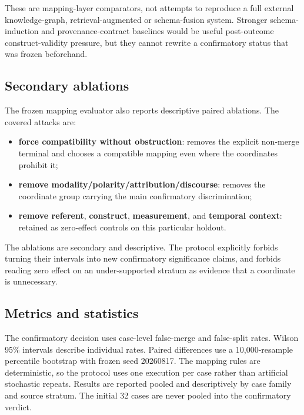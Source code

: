 These are mapping-layer comparators, not attempts to reproduce a full external
knowledge-graph, retrieval-augmented or schema-fusion system. Stronger
schema-induction and provenance-contract baselines would be useful
post-outcome construct-validity pressure, but they cannot rewrite a
confirmatory status that was frozen beforehand.

\subsection{Secondary ablations}

The frozen mapping evaluator also reports descriptive paired ablations. The
covered attacks are:

\begin{itemize}
    \item \textbf{force compatibility without obstruction}: removes the
          explicit non-merge terminal and chooses a compatible mapping even
          where the coordinates prohibit it;
    \item \textbf{remove modality/polarity/attribution/discourse}: removes the
          coordinate group carrying the main confirmatory discrimination;
    \item \textbf{remove referent}, \textbf{construct},
          \textbf{measurement}, and \textbf{temporal context}: retained as
          zero-effect controls on this particular holdout.
\end{itemize}

The ablations are secondary and descriptive. The protocol explicitly forbids
turning their intervals into new confirmatory significance claims, and forbids
reading zero effect on an under-supported stratum as evidence that a
coordinate is unnecessary.

\subsection{Metrics and statistics}

The confirmatory decision uses case-level false-merge and false-split rates.
Wilson 95\% intervals describe individual rates. Paired differences use a
10,000-resample percentile bootstrap with frozen seed 20260817. The mapping
rules are deterministic, so the protocol uses one execution per case rather
than artificial stochastic repeats. Results are reported pooled and
descriptively by case family and source stratum. The initial 32 cases are
never pooled into the confirmatory verdict.

